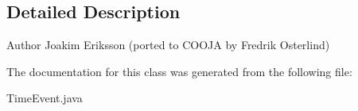 \subsection{Detailed Description}
\begin{DoxyAuthor}{Author}
Joakim Eriksson (ported to C\-O\-O\-J\-A by Fredrik Osterlind) 
\end{DoxyAuthor}


The documentation for this class was generated from the following file\-:\begin{DoxyCompactItemize}
\item 
Time\-Event.\-java\end{DoxyCompactItemize}
